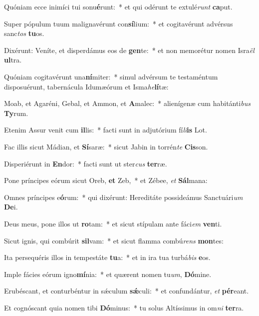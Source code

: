 \item Quóniam ecce inimíci tui sonu\textbf{é}runt:~* et qui odérunt te extulé\textit{runt} \textbf{ca}put.
\item Super pópulum tuum malignavérunt con\textbf{sí}lium:~* et cogitavérunt advérsus sanc\textit{tos} \textbf{tu}os.
\item Dixérunt: Veníte, et disperdámus eos de \textbf{gen}te:~* et non memorétur nomen Isra\textit{ël} \textbf{ul}tra.
\item Quóniam cogitavérunt una\textbf{ní}miter:~* simul advérsum te testaméntum disposuérunt, tabernácula Idumæórum et Isma\textit{he}\textbf{lí}tæ:
\item Moab, et Agaréni, Gebal, et Ammon, et \textbf{A}malec:~* alienígenæ cum habitánti\textit{bus} \textbf{Ty}rum.
\item Etenim Assur venit cum \textbf{il}lis:~* facti sunt in adjutórium fí\textit{li}\textbf{is} Lot.
\item Fac illis sicut Mádian, et \textbf{Sí}saræ:~* sicut Jabin in torrén\textit{te} \textbf{Cis}son.
\item Disperiérunt in \textbf{En}dor:~* facti sunt ut ster\textit{cus} \textbf{ter}ræ.
\item Pone príncipes eórum sicut Oreb, \textbf{et} Zeb,~* et Zébee, \textit{et} \textbf{Sál}mana:
\item Omnes príncipes e\textbf{ó}rum:~* qui dixérunt: Hereditáte possideámus Sanctuári\textit{um} \textbf{De}i.
\item Deus meus, pone illos ut \textbf{ro}tam:~* et sicut stípulam ante fáci\textit{em} \textbf{ven}ti.
\item Sicut ignis, qui combúrit \textbf{sil}vam:~* et sicut flamma combú\textit{rens} \textbf{mon}tes:
\item Ita persequéris illos in tempestáte \textbf{tu}a:~* et in ira tua turbá\textit{bis} \textbf{e}os.
\item Imple fácies eórum igno\textbf{mí}nia:~* et quærent nomen tu\textit{um}, \textbf{Dó}mine.
\item Erubéscant, et conturbéntur in sǽculum \textbf{sǽ}culi:~* et confundántur, \textit{et} \textbf{pér}eant.
\item Et cognóscant quia nomen tibi \textbf{Dó}minus:~* tu solus Altíssimus in om\textit{ni} \textbf{ter}ra.
